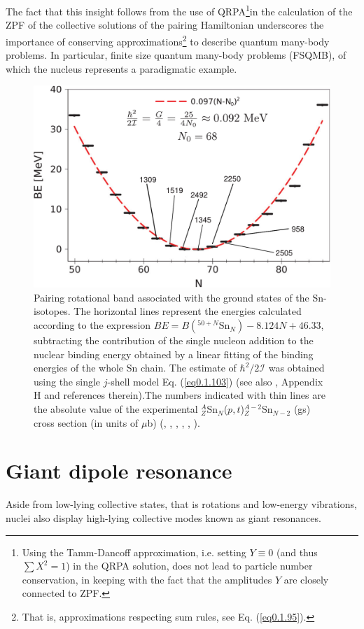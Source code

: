 The fact that this insight follows from the use of QRPA\footnote{Using the Tamm-Dancoff approximation, i.e. setting $Y\equiv0$ (and thus $\sum X^2=1$) in the QRPA solution,  does not lead to particle number conservation, in keeping with the fact that the amplitudes $Y$ are closely connected to ZPF.}in the calculation of the ZPF of the collective solutions of the pairing Hamiltonian underscores the importance of conserving approximations\footnote{That is, approximations respecting sum rules, see Eq. (\ref{eq0.1.95}).} to describe quantum many-body problems. In particular,  finite size quantum many-body problems (FSQMB), of which the nucleus represents a paradigmatic example. 
\begin{figure}
	\centerline {
		\includegraphics*[width=12cm, angle=0.]{introduccion/figs/fig0_4_5_v3}
	}
	\caption{Pairing rotational band associated with the ground states of the Sn-isotopes. The horizontal lines represent the energies calculated according to the expression $BE = B( ^{50+N}\text{Sn}_N ) - 8.124N + 46.33$, subtracting the contribution of the single nucleon addition to the nuclear binding		energy obtained by a linear fitting of the binding energies of the whole Sn chain. The estimate of $\hbar^2/2\mathcal I$ was obtained using the single $j$-shell model Eq. (\ref{eq0.1.103}) (see also  \cite{Brink:05}, Appendix H and references therein).The numbers indicated with thin lines  are the absolute value of the experimental $^A_Z$Sn$_N$($p,t$)$^{A-2}_Z$Sn$_{N-2}$ (gs) cross section (in units of $\mu $b)  (\cite{Guazzoni:99}, \cite{Guazzoni:04}, \cite{Guazzoni:06}, \cite{Guazzoni:08}, \cite{Guazzoni:11}, \cite{Guazzoni:12}).}
	\label{fig0.4.5}
\end{figure}
\section{Giant dipole resonance}\label{S1.5}
Aside from low-lying collective states, that is rotations and low-energy vibrations, nuclei also display high-lying collective modes known as giant resonances.




